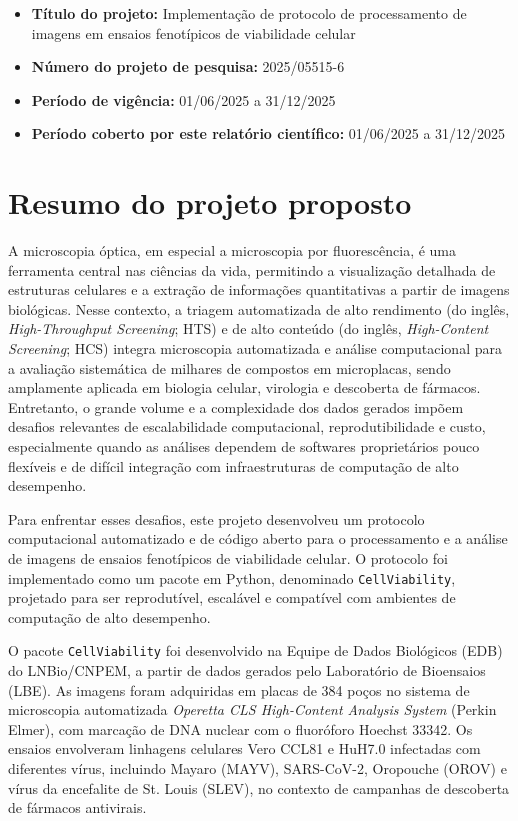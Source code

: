 \documentclass[12pt]{article}
\begin{document}

\begin{itemize}
  \item \textbf{Título do projeto:} Implementação de protocolo de processamento de imagens em ensaios fenotípicos de viabilidade celular
  \item \textbf{Número do projeto de pesquisa:} 2025/05515-6
  \item \textbf{Período de vigência:} 01/06/2025 a 31/12/2025
  \item \textbf{Período coberto por este relatório científico:} 01/06/2025 a 31/12/2025
\end{itemize}

\clearpage

\tableofcontents
\pagebreak

\section{Resumo do projeto proposto}

A microscopia óptica, em especial a microscopia por fluorescência, é uma ferramenta central nas ciências da vida, permitindo a visualização detalhada de estruturas celulares e a extração de informações quantitativas a partir de imagens biológicas. Nesse contexto, a triagem automatizada de alto rendimento (do inglês, \textit{High-Throughput Screening}; HTS) e de alto conteúdo (do inglês, \textit{High-Content Screening}; HCS) integra microscopia automatizada e análise computacional para a avaliação sistemática de milhares de compostos em microplacas, sendo amplamente aplicada em biologia celular, virologia e descoberta de fármacos. Entretanto, o grande volume e a complexidade dos dados gerados impõem desafios relevantes de escalabilidade computacional, reprodutibilidade e custo, especialmente quando as análises dependem de softwares proprietários pouco flexíveis e de difícil integração com infraestruturas de computação de alto desempenho.

Para enfrentar esses desafios, este projeto desenvolveu um protocolo computacional automatizado e de código aberto para o processamento e a análise de imagens de ensaios fenotípicos de viabilidade celular. O protocolo foi implementado como um pacote em Python, denominado \texttt{CellViability}, projetado para ser reprodutível, escalável e compatível com ambientes de computação de alto desempenho.

O pacote \texttt{CellViability} foi desenvolvido na Equipe de Dados Biológicos (EDB) do LNBio/CNPEM, a partir de dados gerados pelo Laboratório de Bioensaios (LBE). As imagens foram adquiridas em placas de 384 poços no sistema de microscopia automatizada \textit{Operetta CLS High-Content Analysis System} (Perkin Elmer), com marcação de DNA nuclear com o fluoróforo Hoechst 33342. Os ensaios envolveram linhagens celulares Vero CCL81 e HuH7.0 infectadas com diferentes vírus, incluindo Mayaro (MAYV), SARS-CoV-2, Oropouche (OROV) e vírus da encefalite de St. Louis (SLEV), no contexto de campanhas de descoberta de fármacos antivirais.
\end{document}
